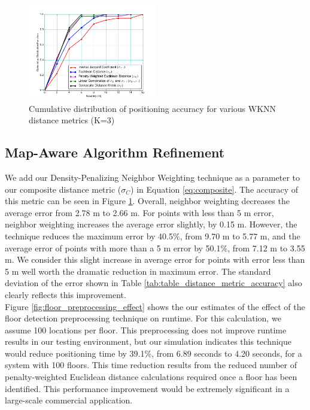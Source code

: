 \documentclass[conference]{IEEEtran}
\begin{document}
\begin{figure}[t!]
  \centering
    \includegraphics[width=0.5\textwidth]{distance_comparison.png}
    \caption{Cumulative distribution of positioning accuracy for various WKNN distance metrics (K=3)}
    \label{fig:cdf_positioning_accuracy}
\end{figure}


\subsection{Map-Aware Algorithm Refinement}

We add our Density-Penalizing Neighbor Weighting technique as a parameter to our composite distance metric ($\sigma_C$) in Equation \ref{eq:composite}. The accuracy of this metric can be seen in Figure \ref{fig:cdf_positioning_accuracy}. Overall, neighbor weighting decreases the average error from 2.78 m to 2.66 m. For points with less than 5 m error, neighbor weighting increases the average error slightly, by 0.15 m. However, the technique reduces the maximum error by 40.5\%, from 9.70 m to 5.77 m, and the average error of points with more than a 5 m error by 50.1\%, from 7.12 m to 3.55 m. We consider this slight increase in average error for points with error less than 5 m well worth the dramatic reduction in maximum error. The standard deviation of the error shown in Table \ref{tab:table_distance_metric_accuracy} also clearly reflects this improvement.\\	
\indent Figure \ref{fig:floor_preprocessing_effect} shows the our estimates of the effect of the floor detection preprocessing technique on runtime. For this calculation, we assume 100 locations per floor. This preprocessing does not improve runtime results in our testing environment, but our simulation indicates this technique would reduce positioning time by 39.1\%, from 6.89 seconds to 4.20 seconds, for a system with 100 floors. This time reduction results from the reduced number of penalty-weighted Euclidean distance calculations required once a floor has been identified. This performance improvement would be extremely significant in a large-scale commercial application.
\end{document}
